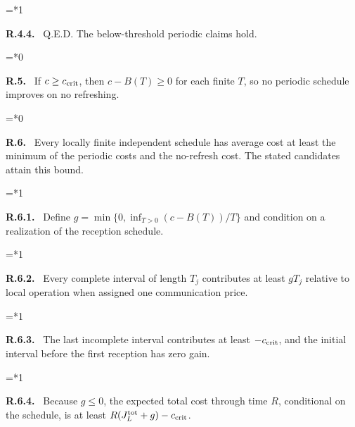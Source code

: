 \documentclass[11pt,letterpaper]{article}
\newenvironment{proofstep}[2]{%
  \begin{list}{}{\leftmargin=\dimexpr 0.17in*#2\relax%
  \setlength{\rightmargin}{0pt}\setlength{\topsep}{5pt}\setlength{\parsep}{2pt}}%
  \item[]\textbf{\textcolor{ink}{#1.}}\ }{\end{list}}
\begin{document}
\begin{proofstep}{R.4.4}{1}
Q.E.D. The below-threshold periodic claims hold.
\par\nopagebreak{}
\end{proofstep}
\begin{proofstep}{R.5}{0}
If $c\ge c_{\rm crit}$, then $c-B(T)\ge0$ for each finite $T$, so no periodic schedule improves on no refreshing.
\par\nopagebreak{}
\end{proofstep}
\begin{proofstep}{R.6}{0}
Every locally finite independent schedule has average cost at least the minimum of the periodic costs and the no-refresh cost. The stated candidates attain this bound.
\par\nopagebreak{}
\end{proofstep}
\begin{proofstep}{R.6.1}{1}
Define $g=\min\{0,\inf_{T>0}(c-B(T))/T\}$ and condition on a realization of the reception schedule.
\par\nopagebreak{}
\end{proofstep}
\begin{proofstep}{R.6.2}{1}
Every complete interval of length $T_j$ contributes at least $gT_j$ relative to local operation when assigned one communication price.
\par\nopagebreak{}
\end{proofstep}
\begin{proofstep}{R.6.3}{1}
The last incomplete interval contributes at least $-c_{\rm crit}$, and the initial interval before the first reception has zero gain.
\par\nopagebreak{}
\end{proofstep}
\begin{proofstep}{R.6.4}{1}
Because $g\le0$, the expected total cost through time $R$, conditional on the schedule, is at least $R(J_L^{\rm tot}+g)-c_{\rm crit}$.
\par\nopagebreak{}
\end{proofstep}
\end{document}

